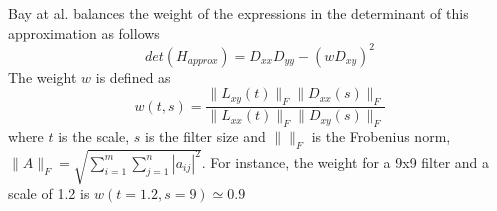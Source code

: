 Bay at al. balances the weight of the expressions in the determinant of this approximation as follows
\begin{equation}
    det(H_{approx}) = D_{xx} D_{yy} - (w D_{xy})^2
\end{equation}
The weight $w$ is defined as 
\begin{equation}
w(t,s) = \frac{\|L_{xy}(t)\|_F \|D_{xx}(s)\|_F}{\|L_{xx}(t)\|_F \|D_{xy}(s)\|_F}
\end{equation}
where $t$ is the scale, $s$ is the filter size and $\|\|_F$ is the Frobenius norm, $\|A\|_F=\sqrt{\sum_{i=1}^m\sum_{j=1}^n |a_{ij}|^2}$.
For instance, the weight for a 9x9 filter and a scale of 1.2 is $w(t=1.2, s=9) \simeq 0.9$

